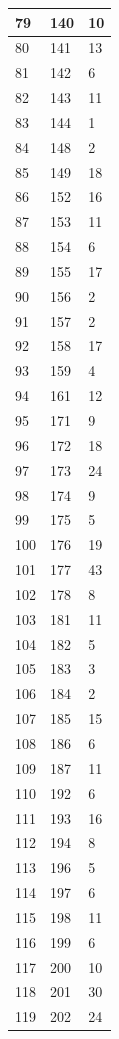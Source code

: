 \begin{tabular}{p{}p{}p{}}
\hline
79 & 140 & 10 \\
\hline
80 & 141 & 13 \\
\hline
81 & 142 & 6 \\
\hline
82 & 143 & 11 \\
\hline
83 & 144 & 1 \\
\hline
84 & 148 & 2 \\
\hline
85 & 149 & 18 \\
\hline
86 & 152 & 16 \\
\hline
87 & 153 & 11 \\
\hline
88 & 154 & 6 \\
\hline
89 & 155 & 17 \\
\hline
90 & 156 & 2 \\
\hline
91 & 157 & 2 \\
\hline
92 & 158 & 17 \\
\hline
93 & 159 & 4 \\
\hline
94 & 161 & 12 \\
\hline
95 & 171 & 9 \\
\hline
96 & 172 & 18 \\
\hline
97 & 173 & 24 \\
\hline
98 & 174 & 9 \\
\hline
99 & 175 & 5 \\
\hline
100 & 176 & 19 \\
\hline
101 & 177 & 43 \\
\hline
102 & 178 & 8 \\
\hline
103 & 181 & 11 \\
\hline
104 & 182 & 5 \\
\hline
105 & 183 & 3 \\
\hline
106 & 184 & 2 \\
\hline
107 & 185 & 15 \\
\hline
108 & 186 & 6 \\
\hline
109 & 187 & 11 \\
\hline
110 & 192 & 6 \\
\hline
111 & 193 & 16 \\
\hline
112 & 194 & 8 \\
\hline
113 & 196 & 5 \\
\hline
114 & 197 & 6 \\
\hline
115 & 198 & 11 \\
\hline
116 & 199 & 6 \\
\hline
117 & 200 & 10 \\
\hline
118 & 201 & 30 \\
\hline
119 & 202 & 24 \\
\hline
\bottomrule
\end{tabular}

